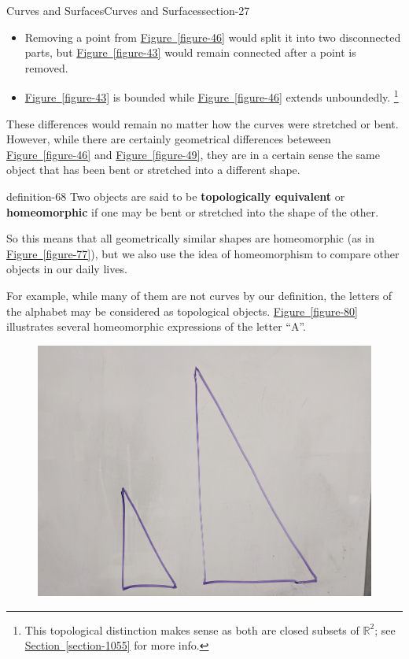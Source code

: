 \documentclass[oneside,10pt,]{article}
\newcommand{\terminology}[1]{\textbf{#1}}
\begin{document}
\begin{sectionptx}{Curves and Surfaces}{}{Curves and Surfaces}{}{}{section-27}
\begin{itemize}[label=\textbullet]
\item{}Removing a point from \hyperref[figure-46]{Figure~\ref{figure-46}} would split it into two disconnected parts, but \hyperref[figure-43]{Figure~\ref{figure-43}} would remain connected after a point is removed.%
\item{}\hyperref[figure-43]{Figure~\ref{figure-43}} is bounded while \hyperref[figure-46]{Figure~\ref{figure-46}} extends unboundedly. \footnote{This topological distinction makes sense as both are closed subsets of \(\mathbb R^2\); see \hyperref[section-1055]{Section~\ref{section-1055}} for more info.\label{fn-62}}%
\end{itemize}
\hypertarget{p-65}{}%
These differences would remain no matter how the curves were stretched or bent. However, while there are certainly geometrical differences beteween \hyperref[figure-46]{Figure~\ref{figure-46}} and \hyperref[figure-49]{Figure~\ref{figure-49}}, they are in a certain sense the same object that has been bent or stretched into a different shape.%
\begin{definition}{}{definition-68}%
\hypertarget{p-69}{}%
Two objects are said to be \terminology{topologically equivalent} or \terminology{homeomorphic} if one may be bent or stretched into the shape of the other.%
\end{definition}
\hypertarget{p-72}{}%
So this means that all geometrically similar shapes are homeomorphic (as in \hyperref[figure-77]{Figure~\ref{figure-77}}), but we also use the idea of homeomorphism to compare other objects in our daily lives.%
\par
\hypertarget{p-74}{}%
For example, while many of them are not curves by our definition, the letters of the alphabet may be considered as topological objects. \hyperref[figure-80]{Figure~\ref{figure-80}} illustrates several homeomorphic expressions of the letter ``A''.%
\begin{figure}
\centering
\includegraphics[width=1\linewidth]{images/similar-triangles.jpg}

\end{figure}
\end{sectionptx}
\end{document}
